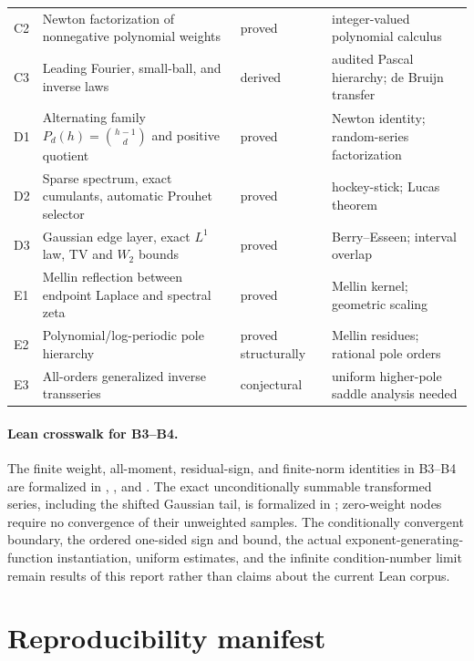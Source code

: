 \documentclass[11pt,oneside]{article}
\numberwithin{equation}{section}
\theoremstyle{definition}
\theoremstyle{remark}
\begin{document}
\begin{longtable}{@{}>{\raggedright\arraybackslash}p{}>{\raggedright\arraybackslash}p{}>{\raggedright\arraybackslash}p{}>{\raggedright\arraybackslash}p{}@{}}
C2 & Newton factorization of nonnegative polynomial weights & proved & integer-valued polynomial calculus\\
C3 & Leading Fourier, small-ball, and inverse laws & derived & audited Pascal hierarchy; de Bruijn transfer\\
D1 & Alternating family $P_d(h)=\binom{h-1}{d}$ and positive quotient & proved & Newton identity; random-series factorization\\
D2 & Sparse spectrum, exact cumulants, automatic Prouhet selector & proved & hockey-stick; Lucas theorem\\
D3 & Gaussian edge layer, exact $L^1$ law, TV and $W_2$ bounds & proved & Berry--Esseen; interval overlap\\
E1 & Mellin reflection between endpoint Laplace and spectral zeta & proved & Mellin kernel; geometric scaling\\
E2 & Polynomial/log-periodic pole hierarchy & proved structurally & Mellin residues; rational pole orders\\
E3 & All-orders generalized inverse transseries & conjectural & uniform higher-pole saddle analysis needed\\
\bottomrule
\end{longtable}

\paragraph{Lean crosswalk for B3--B4.}
The finite weight, all-moment, residual-sign, and finite-norm identities in
B3--B4 are formalized in ,
, and
.  The exact unconditionally summable
transformed series, including the shifted Gaussian tail, is formalized in
; zero-weight nodes require no convergence of
their unweighted samples.  The conditionally convergent boundary, the ordered
one-sided sign and bound, the actual exponent-generating-function instantiation,
uniform estimates, and the infinite condition-number limit remain results of
this report rather than claims about the current Lean corpus.

\section{Reproducibility manifest}
\label{p1:app:manifest}
\end{document}

